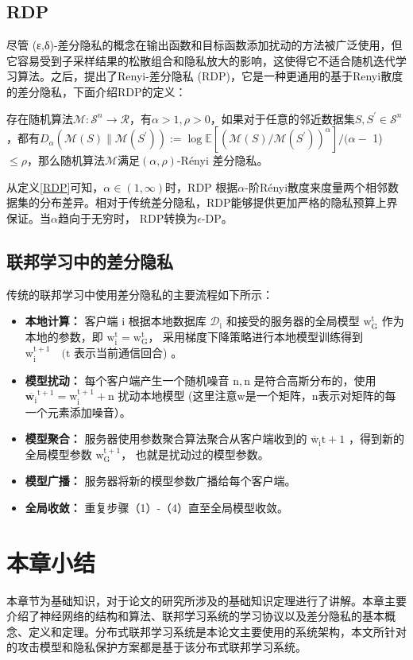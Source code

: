 \subsection{RDP}
尽管 (ε,δ)-差分隐私的概念在输出函数和目标函数添加扰动的方法被广泛使用，但它容易受到子采样结果的松散组合和隐私放大的影响，这使得它不适合随机迭代学习算法。之后，提出了Renyi-差分隐私 (RDP)，它是一种更通用的基于Renyi散度的差分隐私，下面介绍RDP的定义：

\begin{define}[RDP]\label{RDP}
存在随机算法$\mathcal{M}: \mathcal{S}^{n} \rightarrow \mathcal{R}$，有$\alpha>1, \rho>0$，如果对于任意的邻近数据集$S, S^{\prime} \in \mathcal{S}^{n}$，都有$D_{\alpha}\left(\mathcal{M}(S) \| \mathcal{M}\left(S^{\prime}\right)\right):=\log \mathbb{E}\left[\left(\mathcal{M}(S) / \mathcal{M}\left(S^{\prime}\right)\right)^{\alpha}\right] /(\alpha-$ 1) $\leq \rho$，那么随机算法$\mathcal{M}$满足$(\alpha, \rho)$-Rényi 差分隐私。
\end{define}

从定义\ref{RDP}可知，$\alpha \in(1, \infty)$时，RDP 根据$\alpha$-阶Rényi散度来度量两个相邻数据集的分布差异。相对于传统差分隐私，RDP能够提供更加严格的隐私预算上界保证。当$\alpha$趋向于无穷时， RDP转换为$\epsilon$-DP。

\subsection{联邦学习中的差分隐私}
传统的联邦学习中使用差分隐私的主要流程如下所示：
\begin{itemize}
\item \textbf{本地计算：}
客户端 $\mathrm{i}$ 根据本地数据库 $\mathcal{D}_{\mathrm{i}}$ 和接受的服务器的全局模型 $\mathrm{w}_{\mathrm{G}}^{\mathrm{t}}$ 作为本地的参数，即 $\mathrm{w}_{\mathrm{i}}^{\mathrm{t}}=\mathrm{w}_{\mathrm{G}}^{\mathrm{t}}$， 采用梯度下降策略进行本地模型训练得到 $\mathrm{w}_{\mathrm{i}}^{\mathrm{t}+1} \quad(\mathrm{t}$ 表示当前通信回合) 。

\item \textbf{模型扰动：}
每个客户端产生一个随机噪音 $\mathrm{n},\mathrm{n}$ 是符合高斯分布的，使用 $\overline{\mathbf{w}_{\mathrm{i}}}^{\mathrm{t}+1}=\mathrm{w}_{\mathrm{i}}^{\mathrm{t}+1}+\mathrm{n}$ 扰动本地模型 (这里注意w是一个矩阵，n表示对矩阵的每一个元素添加噪音）。

\item \textbf{模型聚合：}
服务器使用参数聚合算法聚合从客户端收到的 $\overline{\mathrm{w}}_{\mathrm{i}} \mathrm{t}+1$ ，得到新的全局模型参数 $\mathrm{w}_{\mathrm{G}}^{\mathrm{t}+1}$， 也就是扰动过的模型参数。

\item \textbf{模型广播：}
服务器将新的模型参数广播给每个客户端。

\item \textbf{全局收敛：}
重复步骤（1）-（4）直至全局模型收敛。
\end{itemize}

\section{本章小结}
本章节为基础知识，对于论文的研究所涉及的基础知识定理进行了讲解。本章主要介绍了神经网络的结构和算法、联邦学习系统的学习协议以及差分隐私的基本概念、定义和定理。分布式联邦学习系统是本论文主要使用的系统架构，本文所针对的攻击模型和隐私保护方案都是基于该分布式联邦学习系统。
